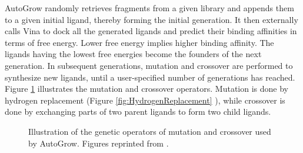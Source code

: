 AutoGrow randomly retrieves fragments from a given library and appends them to a given initial ligand, thereby forming the initial generation. It then externally calls Vina \citep{595-2010} to dock all the generated ligands and predict their binding affinities in terms of free energy. Lower free energy implies higher binding affinity. The ligands having the lowest free energies become the founders of the next generation. In subsequent generations, mutation and crossover are performed to synthesize new ligands, until a user-specified number of generations has reached. Figure \ref{fig:SynthesisMutationCrossover} \citep{466-2009} illustrates the mutation and crossover operators. Mutation is done by hydrogen replacement (Figure \ref{fig:HydrogenReplacement} \citep{325-2009}), while crossover is done by exchanging parts of two parent ligands to form two child ligands.

\begin{figure}
\centering
{}
\caption{Illustration of the genetic operators of mutation and crossover used by AutoGrow. Figures reprinted from \citep{466-2009}.}
\label{fig:SynthesisMutationCrossover}
\end{figure}


